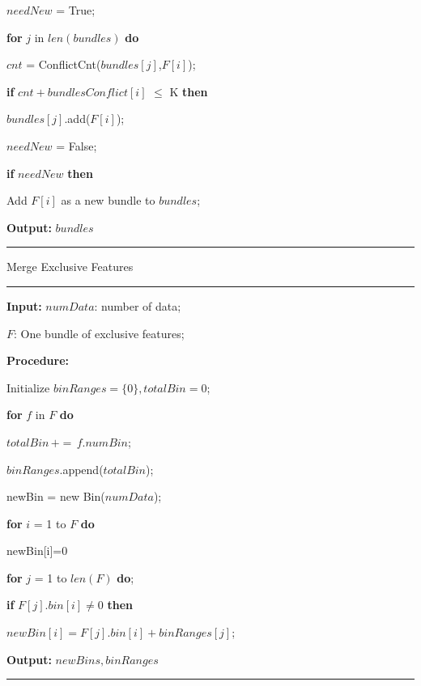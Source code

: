 \documentclass[a4paper]{article}
\begin{document}
\begin{enumerate}
						\hspace*{64pt}	$needNew$ = True;\par
						\hspace*{64pt}  \textbf{for} $j$ in $len(bundles)$ \textbf{do}\par
						\hspace*{80pt}	$cnt$ = ConflictCnt($bundles[j]$,$F[i]$);\par
						\hspace*{80pt}  \textbf{if} $cnt+bundlesConflict[i]$ $\leq$ K \textbf{then}\par
						\hspace*{96pt}  $bundles[j]$.add($F[i]$);\par
						\hspace*{96pt}  $needNew$ = False;\par
						\hspace*{64pt}  \textbf{if} $needNew$ \textbf{then}\par
						\hspace*{80pt}  Add $F[i]$ as a new bundle to $bundles$;\par
						\textbf{Output:} $bundles$\par
				\noindent\rule[0.10\baselineskip]{\textwidth}{0.5pt}
				Merge Exclusive Features\\
				\noindent\rule[0.10\baselineskip]{\textwidth}{0.5pt}
						\textbf{Input:} $numData$: number of data;\par
						\hspace*{32pt} $F$: One bundle of exclusive features;\par
						\textbf{Procedure:}\par
						\hspace*{32pt} Initialize $binRanges = \{0\}, totalBin = 0$;\par
						\hspace*{48pt} \textbf{for} $f$ in $F$ \textbf{do}\par
						\hspace*{64pt}	$totalBin\, +=\, f.numBin$;\par
						\hspace*{64pt}	$binRanges$.append($totalBin$);\par
						\hspace*{48pt}	newBin = new Bin($numData$);\par
						\hspace*{32pt}	\textbf{for} $i$ = 1 to $F$ \textbf{do}\par
						\hspace*{48pt}	newBin[i]=0\par
						\hspace*{48pt}  \textbf{for} $j$ = 1 to $len(F)$ \textbf{do};\par
						\hspace*{64pt}  \textbf{if} $F[j].bin[i]\neq 0$ \textbf{then}\par
						\hspace*{64pt}  $newBin[i] = F[j].bin[i]+binRanges[j]$;\par
						\textbf{Output:} $newBins, binRanges$\par
				\noindent\rule[0.10\baselineskip]{\textwidth}{0.75pt}\par


\end{enumerate}
\end{document}
